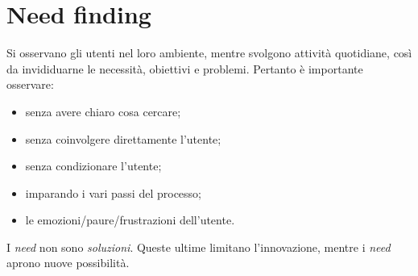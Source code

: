 \section{Need finding}
Si osservano gli utenti nel loro ambiente, mentre svolgono attivit\`a quotidiane, così da invididuarne le necessit\`a, obiettivi e problemi. Pertanto \`e importante osservare:
\begin{itemize}
	\item senza avere chiaro cosa cercare;
	\item senza coinvolgere direttamente l'utente;
	\item senza condizionare l'utente;
	\item imparando i vari passi del processo;
	\item le emozioni/paure/frustrazioni dell'utente.
\end{itemize}
I \textit{need} non sono \textit{soluzioni}. Queste ultime limitano l'innovazione, mentre i \textit{need} aprono nuove possibilit\`a.

